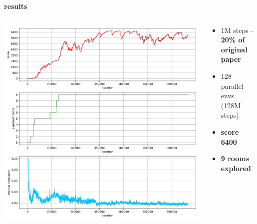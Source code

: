 \documentclass[xcolor=dvipsnames]{beamer}
\begin{document}
\begin{frame}{\bf results}


\begin{columns}

    \begin{column}{0.5\textwidth}
      \includegraphics[scale=0.25]{../results/montezuma_ppo_rnd_a.png}
    \end{column}

    \begin{column}{0.5\textwidth}
      \begin{itemize}
        \item 1M  steps - {\bf 20\% of original paper}
        \item 128 parallel envs (128M steps)
        \item {\bf score 6400}
        \item {\bf 9 rooms explored}
      \end{itemize}
    \end{column}


  \end{columns}


\end{frame}
\end{document}
